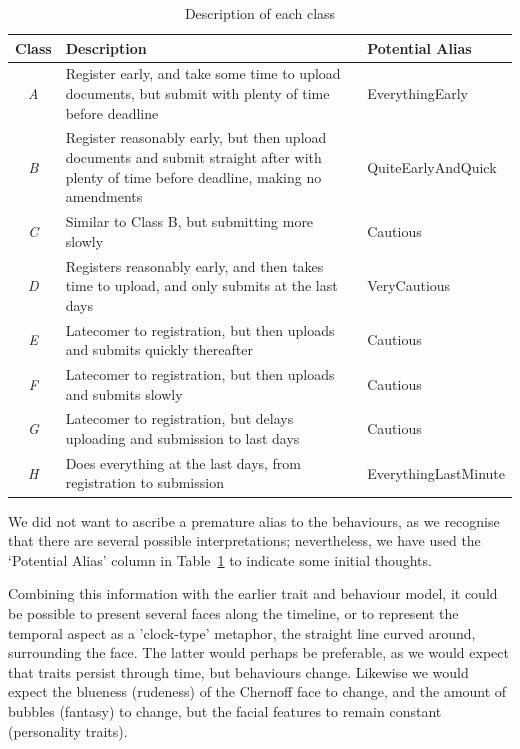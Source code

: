 \documentclass{AISB2008}
\begin{document}
\begin{table}[!htb]
\centering
\begin{tabularx}{\textwidth}{c X l}
\hline
Class & Description & Potential Alias  \\ 
\hline
{\emph{A}} & Register early, and take some time to upload documents, but submit with plenty of time before deadline & EverythingEarly\\
{\emph{B}} & Register reasonably early, but then upload documents and submit straight after with plenty of time before deadline, making no amendments & QuiteEarlyAndQuick\\
{\emph{C}} & Similar to Class B, but submitting more slowly & Cautious\\
{\emph{D}} & Registers reasonably early, and then takes time to upload, and only submits at the last days & VeryCautious\\
{\emph{E}} & Latecomer to registration, but then uploads and submits
quickly thereafter & Cautious\\
{\emph{F}} & Latecomer to registration, but then uploads and submits
slowly & Cautious\\
{\emph{G}} & Latecomer to registration, but delays uploading and
submission to last days & Cautious\\
{\emph{H}} & Does everything at the last days, from registration to submission & EverythingLastMinute\\
\hline
\end{tabularx}
\caption{Description of each class}
\label{tbl:classdesc}
\end{table}

We did not want to ascribe a premature alias to the behaviours, as we
recognise that there are several possible interpretations;
nevertheless, we have used the `Potential Alias' column in
Table~\ref{tbl:classdesc} to indicate some initial thoughts.

Combining this information with the earlier trait and behaviour model,
it could be possible to present several faces along the timeline, or
to represent the temporal aspect as a 'clock-type' metaphor, the
straight line curved around, surrounding the face.  The latter would
perhaps be preferable, as we would expect that traits persist through
time, but behaviours change. Likewise we would expect the blueness
(rudeness) of the Chernoff face to change, and the amount of bubbles
(fantasy) to change, but the facial features to remain constant
(personality traits).
\end{document}
